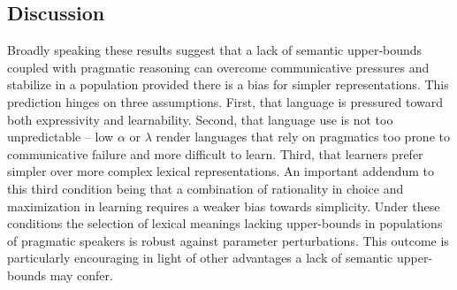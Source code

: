 \documentclass[a4paper]{article}
\begin{document}
\subsection{Discussion}
Broadly speaking these results suggest that a lack of semantic upper-bounds coupled with pragmatic reasoning can overcome communicative pressures and stabilize in a population provided there is a bias for simpler representations. This prediction hinges on three assumptions. First, that language is pressured toward both expressivity and learnability. Second, that language use is not too unpredictable -- low $\alpha$ or $\lambda$ render languages that rely on pragmatics too prone to communicative failure and more difficult to learn. Third, that learners prefer simpler over more complex lexical representations. An important addendum to this third condition being that a combination of rationality in choice and maximization in learning requires a weaker bias towards simplicity. Under these conditions the selection of lexical meanings lacking upper-bounds in populations of pragmatic speakers is robust against parameter perturbations.  This outcome is particularly encouraging in light of other advantages a lack of semantic upper-bounds may confer. 
\end{document}

